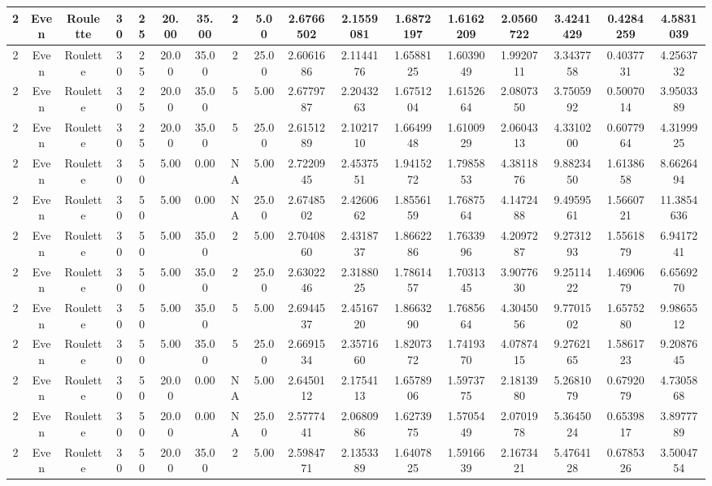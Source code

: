 \begin{longtable}{ | c | c | c | c | c | c | c | c | c | c | c | c | c | c | c | c | c | }
	\hline
	2	&	Even	&	Roulette	&	30	&	25	&	20.00	&	35.00	&	2	&	5.00	&	2.6766502	&	2.1559081	&	1.6872197	&	1.6162209	&	2.0560722	&	3.4241429	&	0.4284259	&	4.5831039 \\
	\hline
	2	&	Even	&	Roulette	&	30	&	25	&	20.00	&	35.00	&	2	&	25.00	&	2.6061686	&	2.1144176	&	1.6588125	&	1.6039049	&	1.9920711	&	3.3437758	&	0.4037731	&	4.2563732 \\
	\hline
	2	&	Even	&	Roulette	&	30	&	25	&	20.00	&	35.00	&	5	&	5.00	&	2.6779787	&	2.2043263	&	1.6751204	&	1.6152664	&	2.0807350	&	3.7505992	&	0.5007014	&	3.9503389 \\
	\hline
	2	&	Even	&	Roulette	&	30	&	25	&	20.00	&	35.00	&	5	&	25.00	&	2.6151289	&	2.1021710	&	1.6649948	&	1.6100929	&	2.0604313	&	4.3310200	&	0.6077964	&	4.3199925 \\
	\hline
	2	&	Even	&	Roulette	&	30	&	50	&	5.00	&	0.00	&	NA	&	5.00	&	2.7220945	&	2.4537551	&	1.9415272	&	1.7985853	&	4.3811876	&	9.8823450	&	1.6138658	&	8.6626494 \\
	\hline
	2	&	Even	&	Roulette	&	30	&	50	&	5.00	&	0.00	&	NA	&	25.00	&	2.6748502	&	2.4260662	&	1.8556159	&	1.7687564	&	4.1472488	&	9.4959561	&	1.5660721	&	11.3854636 \\
	\hline
	2	&	Even	&	Roulette	&	30	&	50	&	5.00	&	35.00	&	2	&	5.00	&	2.7040860	&	2.4318737	&	1.8662286	&	1.7633996	&	4.2097287	&	9.2731293	&	1.5561879	&	6.9417241 \\
	\hline
	2	&	Even	&	Roulette	&	30	&	50	&	5.00	&	35.00	&	2	&	25.00	&	2.6302246	&	2.3188025	&	1.7861457	&	1.7031345	&	3.9077630	&	9.2511422	&	1.4690679	&	6.6569270 \\
	\hline
	2	&	Even	&	Roulette	&	30	&	50	&	5.00	&	35.00	&	5	&	5.00	&	2.6944537	&	2.4516720	&	1.8663290	&	1.7685664	&	4.3045056	&	9.7701502	&	1.6575280	&	9.9865512 \\
	\hline
	2	&	Even	&	Roulette	&	30	&	50	&	5.00	&	35.00	&	5	&	25.00	&	2.6691534	&	2.3571660	&	1.8207372	&	1.7419370	&	4.0787415	&	9.2762165	&	1.5861723	&	9.2087645 \\
	\hline
	2	&	Even	&	Roulette	&	30	&	50	&	20.00	&	0.00	&	NA	&	5.00	&	2.6450112	&	2.1754113	&	1.6578906	&	1.5973775	&	2.1813980	&	5.2681079	&	0.6792079	&	4.7305868 \\
	\hline
	2	&	Even	&	Roulette	&	30	&	50	&	20.00	&	0.00	&	NA	&	25.00	&	2.5777441	&	2.0680986	&	1.6273975	&	1.5705449	&	2.0701978	&	5.3645024	&	0.6539817	&	3.8977789 \\
	\hline
	2	&	Even	&	Roulette	&	30	&	50	&	20.00	&	35.00	&	2	&	5.00	&	2.5984771	&	2.1353389	&	1.6407825	&	1.5916639	&	2.1673421	&	5.4764128	&	0.6785326	&	3.5004754 \\

\end{longtable}
